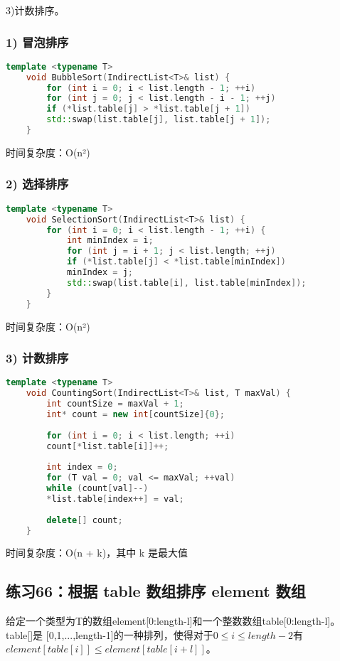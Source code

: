 \documentclass[UTF8]{ctexart}
\begin{document}
3)计数排序。

\subsubsection*{1) 冒泡排序}

\begin{lstlisting}[language=C++]
	template <typename T>
	void BubbleSort(IndirectList<T>& list) {
		for (int i = 0; i < list.length - 1; ++i)
		for (int j = 0; j < list.length - i - 1; ++j)
		if (*list.table[j] > *list.table[j + 1])
		std::swap(list.table[j], list.table[j + 1]);
	}
\end{lstlisting}

时间复杂度：O(n²)

\subsubsection*{2) 选择排序}

\begin{lstlisting}[language=C++]
	template <typename T>
	void SelectionSort(IndirectList<T>& list) {
		for (int i = 0; i < list.length - 1; ++i) {
			int minIndex = i;
			for (int j = i + 1; j < list.length; ++j)
			if (*list.table[j] < *list.table[minIndex])
			minIndex = j;
			std::swap(list.table[i], list.table[minIndex]);
		}
	}
\end{lstlisting}

时间复杂度：O(n²)

\subsubsection*{3) 计数排序}

\begin{lstlisting}[language=C++]
	template <typename T>
	void CountingSort(IndirectList<T>& list, T maxVal) {
		int countSize = maxVal + 1;
		int* count = new int[countSize]{0};
		
		for (int i = 0; i < list.length; ++i)
		count[*list.table[i]]++;
		
		int index = 0;
		for (T val = 0; val <= maxVal; ++val)
		while (count[val]--)
		*list.table[index++] = val;
		
		delete[] count;
	}
\end{lstlisting}

时间复杂度：O(n + k)，其中 k 是最大值

\subsection*{练习66：根据 table 数组排序 element 数组}
给定一个类型为T的数组element[0:length-l]和一个整数数组table[0:length-l]。table[]是
[0,1,...,length-1]的一种排列，使得对于$0\leq i\leq length-2$有$element[table[i]]\leq element[table
[i+l]]$。
\end{document}
